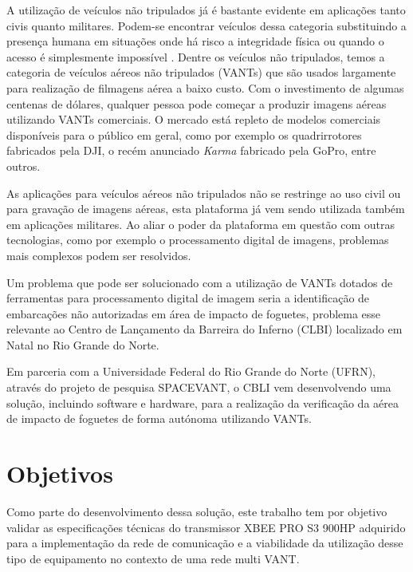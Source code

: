 \label{Cap:introducao}

A utilização de veículos não tripulados já é bastante evidente em aplicações tanto civis quanto militares. Podem-se encontrar veículos dessa categoria substituindo a presença humana em situações onde há risco a integridade física ou quando o acesso é simplesmente impossível \cite{UAVSurveypt1}. Dentre os veículos não tripulados, temos a categoria de veículos aéreos não tripulados (VANTs) que são usados largamente para realização de filmagens aérea a baixo custo. Com o investimento de algumas centenas de dólares, qualquer pessoa pode começar a produzir imagens aéreas utilizando VANTs comerciais. O mercado está repleto de modelos comerciais disponíveis para o público em geral, como por exemplo os quadrirrotores fabricados pela DJI\textsuperscript{\texttrademark}, o recém anunciado \emph{Karma} fabricado pela GoPro\textsuperscript{\texttrademark}, entre outros.

As aplicações para veículos aéreos não tripulados não se restringe ao uso civil ou para gravação de imagens aéreas, esta plataforma já vem sendo utilizada também em aplicações militares. Ao aliar o poder da plataforma em questão com outras tecnologias, como por exemplo o processamento digital de imagens, problemas mais complexos podem ser resolvidos. 

Um problema que pode ser solucionado com a utilização de VANTs dotados de ferramentas para processamento digital de imagem seria a identificação de embarcações não autorizadas em área de impacto de foguetes, problema esse relevante ao Centro de Lançamento da Barreira do Inferno (CLBI) localizado em Natal no Rio Grande do Norte. 

Em parceria com a Universidade Federal do Rio Grande do Norte (UFRN), através do projeto de pesquisa SPACEVANT, o CBLI vem desenvolvendo uma solução, incluindo software e hardware, para a realização da verificação da aérea de impacto de foguetes de forma autónoma utilizando VANTs. 

\section{Objetivos}

Como parte do desenvolvimento dessa solução, este trabalho tem por objetivo validar as especificações técnicas do transmissor XBEE PRO S3 900HP adquirido para a implementação da rede de comunicação e a viabilidade da utilização desse tipo de equipamento no contexto de uma rede multi VANT.

